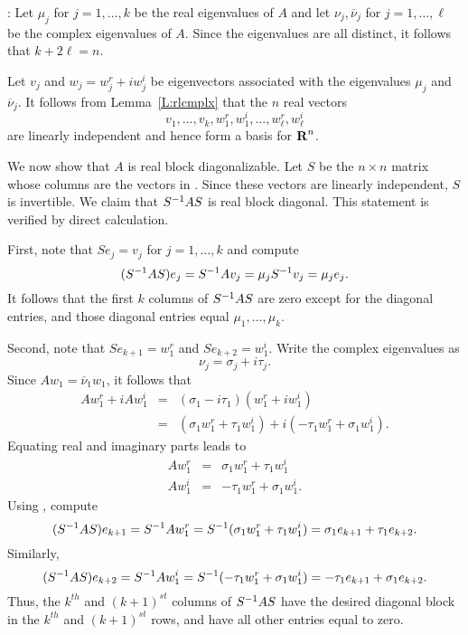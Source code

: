 \documentclass{ximera}
\begin{document}
:   Let $\mu_j$ for 
$j=1,\ldots,k$ be the real eigenvalues of $A$ and let 
$\nu_j,\overline{\nu}_j$ for $j=1,\ldots,\ell$ be the complex eigenvalues of 
$A$. Since the eigenvalues are all distinct, it follows that $k+2\ell=n$.

Let $v_j$ and $w_j=w_j^r+iw_j^i$ be eigenvectors associated with the 
eigenvalues $\mu_j$ and $\overline{\nu}_j$.  It follows from 
Lemma~\ref{L:rlcmplx} that the $n$ real vectors
\begin{equation}  \label{e:complexeigen}
v_1,\ldots,v_k,w_1^r,w_1^i,\ldots,w_\ell^r,w_\ell^i
\end{equation}
are linearly independent and hence form a basis for $\mbox{$\bf{R}$}^n$.

We now show that $A$ is real block diagonalizable.  Let $S$ be the $n\times
n$ matrix whose columns are the vectors in .  Since
these vectors are linearly independent, $S$ is invertible.  We claim that 
$S^{-1} AS$ is real block diagonal.  This statement is verified by direct
calculation.

First, note that $Se_j=v_j$ for $j=1,\ldots,k$ and compute
\[
(S^{-1} AS)e_j = S^{-1} Av_j = \mu_j S^{-1} v_j = \mu_j e_j.
\]
It follows that the first $k$ columns of $S^{-1} AS$ are zero except for the 
diagonal entries, and those diagonal entries equal $\mu_1,\ldots,\mu_k$.

Second, note that $Se_{k+1}=w_1^r$ and $Se_{k+2}=w_1^i$.  Write the complex 
eigenvalues as
\[
\nu_j = \sigma_j+i\tau_j.
\]
Since 
$Aw_1 = \overline{\nu}_1w_1$, it follows that
\begin{eqnarray*}
Aw_1^r+iAw_1^i & = & (\sigma_1-i\tau_1)(w_1^r+iw_1^i)\\
& = & (\sigma_1w_1^r+\tau_1w_1^i) + i(-\tau_1w_1^r +\sigma_1w_1^i).
\end{eqnarray*}
Equating real and imaginary parts leads to 
\begin{equation}  \label{e:complexsimple}
\begin{array}{ccc} Aw_1^r & = & \sigma_1w_1^r+\tau_1w_1^i\\
Aw_1^i & = &   -\tau_1w_1^r+\sigma_1w_1^i. \end{array}
\end{equation}
Using , compute
\[
(S^{-1} AS)e_{k+1} = S^{-1} Aw_1^r = S^{-1}(\sigma_1w_1^r+\tau_1w_1^i) 
= \sigma_1e_{k+1} + \tau_1e_{k+2}.
\]
Similarly, 
\[
(S^{-1} AS)e_{k+2} = S^{-1} Aw_1^i = S^{-1}(-\tau_1w_1^r+\sigma_1w_1^i)
= -\tau_1e_{k+1} + \sigma_1e_{k+2}.
\]
Thus, the $k^{th}$ and $(k+1)^{st}$ columns of $S^{-1} AS$ have the desired
diagonal block in the $k^{th}$ and $(k+1)^{st}$ rows, and have all other 
entries equal to zero.
\end{document}
